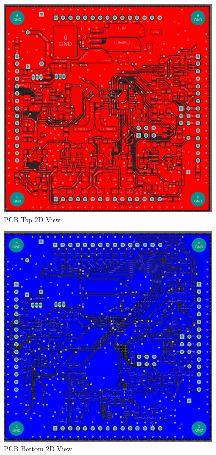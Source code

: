 		\begin{figure}[htbp]
			\centering
			\includegraphics[scale=0.5]{figuras/fig-pcb-design-top.png}
			\caption{PCB Top 2D View \cite{pcb-design-top}}
			\label{fig:pcb-design-top}
		\end{figure}

		\begin{figure}[htbp]
			\centering
			\includegraphics[scale=0.5]{figuras/fig-pcb-design-bottom.png}
			\caption{PCB Bottom 2D View \cite{pcb-design-bottom}}
			\label{fig:pcb-design-bottom}
		\end{figure}

